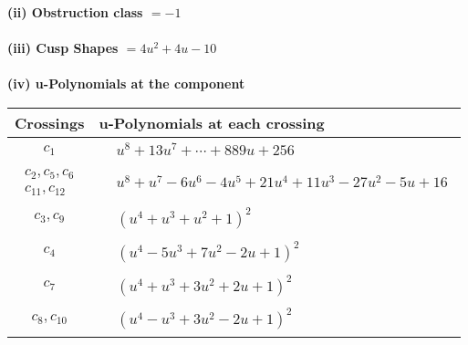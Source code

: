 \documentclass[1p]{elsarticle_modified}
\theoremstyle{definition}
\begin{document}
\flushleft \textbf{(ii) Obstruction class $= -1$}\\~\\
\flushleft \textbf{(iii) Cusp Shapes $= 4 u^2+4 u-10$}\\~\\
\newpage\renewcommand{\arraystretch}{1}
\flushleft \textbf{(iv) u-Polynomials at the component}\newline \\
\begin{tabular}{m{50pt}|m{274pt}}
Crossings & \hspace{64pt}u-Polynomials at each crossing \\
\hline $$\begin{aligned}c_{1}\end{aligned}$$&$\begin{aligned}
&u^8+13 u^7+\cdots+889 u+256
\end{aligned}$\\
\hline $$\begin{aligned}c_{2},c_{5},c_{6}\\c_{11},c_{12}\end{aligned}$$&$\begin{aligned}
&u^8+u^7-6 u^6-4 u^5+21 u^4+11 u^3-27 u^2-5 u+16
\end{aligned}$\\
\hline $$\begin{aligned}c_{3},c_{9}\end{aligned}$$&$\begin{aligned}
&(u^4+u^3+u^2+1)^2
\end{aligned}$\\
\hline $$\begin{aligned}c_{4}\end{aligned}$$&$\begin{aligned}
&(u^4-5 u^3+7 u^2-2 u+1)^2
\end{aligned}$\\
\hline $$\begin{aligned}c_{7}\end{aligned}$$&$\begin{aligned}
&(u^4+u^3+3 u^2+2 u+1)^2
\end{aligned}$\\
\hline $$\begin{aligned}c_{8},c_{10}\end{aligned}$$&$\begin{aligned}
&(u^4- u^3+3 u^2-2 u+1)^2
\end{aligned}$\\
\hline
\end{tabular}\\~\\
\end{document}
